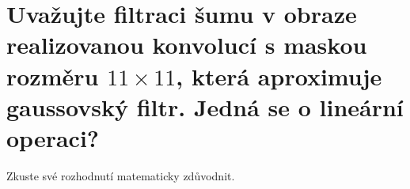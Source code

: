\section{Uvažujte filtraci šumu v obraze realizovanou konvolucí s maskou rozměru 
\texorpdfstring{$11 \times 11$}{11 × 11}, která aproximuje gaussovský filtr. Jedná se o lineární operaci?}
Zkuste své rozhodnutí matematicky zdůvodnit.